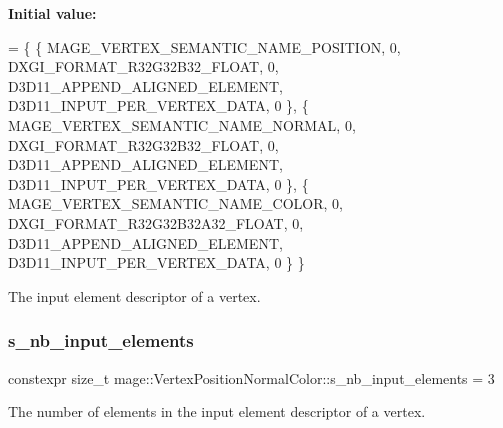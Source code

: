 {\bfseries Initial value\+:}
\begin{DoxyCode}
= \{
        \{ MAGE\_VERTEX\_SEMANTIC\_NAME\_POSITION, 0, DXGI\_FORMAT\_R32G32B32\_FLOAT,    0, 
      D3D11\_APPEND\_ALIGNED\_ELEMENT, D3D11\_INPUT\_PER\_VERTEX\_DATA, 0 \},
        \{ MAGE\_VERTEX\_SEMANTIC\_NAME\_NORMAL,   0, DXGI\_FORMAT\_R32G32B32\_FLOAT,    0, 
      D3D11\_APPEND\_ALIGNED\_ELEMENT, D3D11\_INPUT\_PER\_VERTEX\_DATA, 0 \},
        \{ MAGE\_VERTEX\_SEMANTIC\_NAME\_COLOR,    0, DXGI\_FORMAT\_R32G32B32A32\_FLOAT, 0, 
      D3D11\_APPEND\_ALIGNED\_ELEMENT, D3D11\_INPUT\_PER\_VERTEX\_DATA, 0 \}
    \}
\end{DoxyCode}
The input element descriptor of a vertex. \hypertarget{structmage_1_1_vertex_position_normal_color_ade9c12dfa6b8a61b58e0779e39d52801}{}\label{structmage_1_1_vertex_position_normal_color_ade9c12dfa6b8a61b58e0779e39d52801} 
\subsubsection{\texorpdfstring{s\+\_\+nb\+\_\+input\+\_\+elements}{s\_nb\_input\_elements}}
{\footnotesize\ttfamily constexpr size\+\_\+t mage\+::\+Vertex\+Position\+Normal\+Color\+::s\+\_\+nb\+\_\+input\+\_\+elements = 3\hspace{0.3cm}{\ttfamily [static]}}

The number of elements in the input element descriptor of a vertex. 